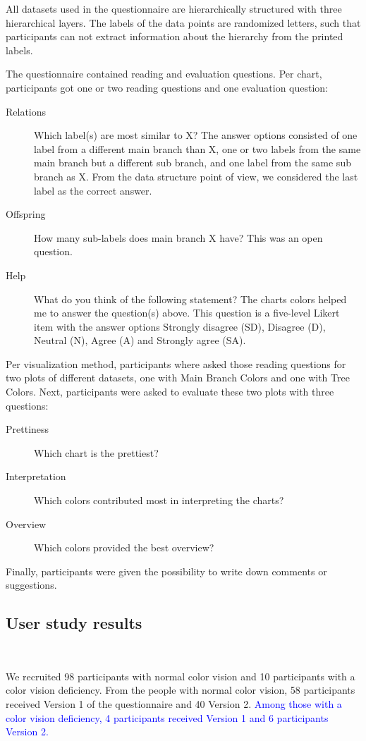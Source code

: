 \documentclass[journal]{vgtc}                %
\newcommand{\changedM}[1]{\textcolor{blue}{#1}}
\begin{document}
All datasets used in the questionnaire are hierarchically structured with three hierarchical layers. The 
labels of the data points are randomized letters, such that participants can not extract information 
about the hierarchy from the printed labels.

The questionnaire contained reading and evaluation questions. Per chart, participants got one or two reading questions and one evaluation question:
\begin{description}
\item[Relations] Which label(s) are most similar to X? The answer options consisted of one label from a different main branch than X, one or two labels from the same main branch but a different sub branch, and one label from the same sub branch as X. From the data structure point of view, we considered the last label as the correct answer.
\item[Offspring] How many sub-labels does main branch X have? This was an open question.
\item[Help] What do you think of the following statement? The charts colors helped me to answer the question(s) above. This question is a five-level Likert item with the answer options Strongly disagree (SD), Disagree (D), Neutral (N), Agree (A) and Strongly agree (SA).
\end{description}
Per visualization method, participants where asked those reading questions for two plots of different datasets, one with Main Branch Colors and one with Tree Colors. 
Next, participants were asked to evaluate these two plots with three questions:
\begin{description}
\item[Prettiness] Which chart is the prettiest?
\item[Interpretation] Which colors contributed most in interpreting the charts?
\item[Overview] Which colors provided the best overview?
\end{description}
Finally, participants were given the possibility to write down comments or suggestions.

\subsection{User study results}~\label{secuserres}

We recruited 98 participants with normal color vision and 10 participants with a color vision deficiency. From the people with normal color vision, 58 participants received Version 1 of the questionnaire and 40 Version 2. \changedM{Among those with a color vision deficiency, 4 participants received Version 1 and 6 participants Version 2.}
\end{document}
